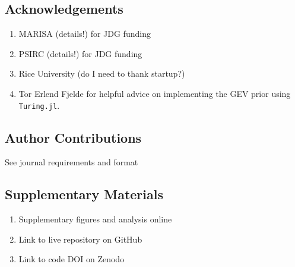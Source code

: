 \documentclass[12pt]{article}
\begin{document}
\subsection*{Acknowledgements}

\begin{enumerate}
    \item MARISA (details!) for JDG funding
    \item PSIRC (details!) for JDG funding
    \item Rice University (do I need to thank startup?)
    \item Tor Erlend Fjelde for helpful advice on implementing the GEV prior using \texttt{Turing.jl}.
\end{enumerate}

\subsection*{Author Contributions}

See journal requirements and format

\subsection*{Supplementary Materials}

\begin{enumerate}
    \item Supplementary figures and analysis online
    \item Link to live repository on GitHub
    \item Link to code DOI on Zenodo
\end{enumerate}

\printbibliography
\end{document}
